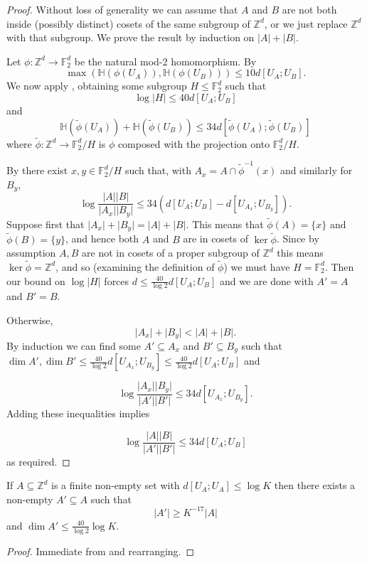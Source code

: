 \begin{proof}
\leanok
Without loss of generality we can assume that $A$ and $B$ are not both inside (possibly distinct) cosets of the same subgroup of $\mathbb{Z}^d$, or we just replace $\mathbb{Z}^d$ with that subgroup. We prove the result by induction on $\lvert A\rvert+\lvert B\rvert$.

Let $\phi:\mathbb{Z}^d\to \mathbb{F}_2^d$ be the natural mod-2 homomorphism. By 
\[\max(\mathbb{H}(\phi(U_A)),\mathbb{H}(\phi(U_B)))\leq 10d[U_A;U_B].\]
We now apply , obtaining some subgroup $H\leq \mathbb{F}_2^d$ such that
\[\log \lvert H\rvert \leq 40d[U_A;U_B]\]
and
\[\mathbb{H}(\tilde{\phi}(U_A))+\mathbb{H}(\tilde{\phi}(U_B))\leq 34 d[\tilde{\phi}(U_A);\tilde{\phi}(U_B)]\]
where $\tilde{\phi}:\mathbb{Z}^d\to \mathbb{F}_2^d/H$ is $\phi$ composed with the projection onto $\mathbb{F}_2^d/H$.


By  there exist $x,y\in \mathbb{F}_2^d/H$ such that, with $A_x=A\cap \tilde{\phi}^{-1}(x)$ and similarly for $B_y$,
\[\log \frac{\lvert A\rvert\lvert B\rvert}{\lvert A_x\rvert\lvert B_y\rvert}\leq 34(d[U_A;U_B]-d[U_{A_x};U_{B_y}]).\]
Suppose first that $\lvert A_x\rvert+\lvert B_y\rvert=\lvert A\rvert+\lvert B\rvert$. This means that $\tilde{\phi}(A)=\{x\}$ and $\tilde{\phi}(B)=\{y\}$, and hence both $A$ and $B$ are in cosets of $\ker \tilde{\phi}$. Since by assumption $A,B$ are not in cosets of a proper subgroup of $\mathbb{Z}^d$ this means $\ker\tilde{\phi}=\mathbb{Z}^d$, and so (examining the definition of $\tilde{\phi}$) we must have $H=\mathbb{F}_2^d$. Then our bound on $\log\lvert H\rvert$ forces $d\leq \frac{40}{\log 2}d[U_A;U_B]$ and we are done with $A'=A$ and $B'=B$.

Otherwise,
\[\lvert A_x\rvert+\lvert B_y\rvert <\lvert A\rvert+\lvert B\rvert.\]
By induction we can find some $A'\subseteq A_x$ and $B'\subseteq B_y$ such that $\dim A',\dim B'\leq \frac{40}{\log 2} d[U_{A_x};U_{B_y}]\leq \frac{40}{\log 2}d[U_A;U_B]$ and

\[\log \frac{\lvert A_x\rvert\lvert B_y\rvert}{\lvert A'\rvert\lvert B'\rvert}\leq 34d[U_{A_x};U_{B_y}].\]
Adding these inequalities implies

\[\log\frac{\lvert A\rvert\lvert B\rvert}{\lvert A'\rvert\lvert B'\rvert}\leq 34d[U_A;U_B]\]
as required.
\end{proof}

\begin{theorem}
  \label{weak-pfr-symm}
  \leanok

  If $A\subseteq \mathbb{Z}^d$ is a finite non-empty set with $d[U_A;U_A]\leq \log K$
  then there exists a non-empty $A'\subseteq A$ such that
  \[\lvert A'\rvert\geq K^{-17}\lvert A\rvert\]
  and $\dim A'\leq \frac{40}{\log 2} \log K$.
\end{theorem}
\begin{proof}
\leanok
Immediate from  and rearranging.
\end{proof}

